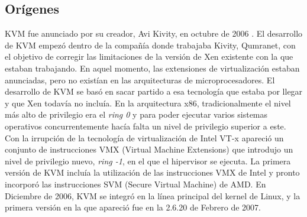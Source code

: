 \subsection{Orígenes}
KVM fue anunciado por su creador, Avi Kivity, en octubre de 2006 \cite{kvm_2}. El desarrollo de KVM empezó dentro de la compañía donde trabajaba Kivity, Qumranet, con el objetivo de corregir las limitaciones de la versión de Xen existente con la que estaban trabajando. En aquel momento, las extensiones de virtualización estaban anunciadas, pero no existían en las arquitecturas de microprocesadores. El desarrollo de KVM se basó en sacar partido a esa tecnología que estaba por llegar y que Xen todavía no incluía. En la arquitectura x86, tradicionalmente el nivel más alto de privilegio era el \textit{ring 0} y para poder ejecutar varios sistemas operativos concurrentemente hacía falta un nivel de privilegio superior a este. Con la irrupción de la tecnología de virtualización de Intel VT-x \cite{intel_vt} apareció un conjunto de instrucciones \acrshort{VMX} (Virtual Machine Extensions) que introdujo un nivel de privilegio nuevo, \textit{ring -1}, en el que el hipervisor se ejecuta. La primera versión de KVM incluía la utilización de las instrucciones \acrshort{VMX} de Intel y pronto incorporó las instrucciones \acrshort{SVM} (Secure Virtual Machine) de AMD. En Diciembre de 2006, KVM se integró en la línea principal del kernel de Linux, y la primera versión en la que apareció fue en la 2.6.20 de Febrero de 2007.

